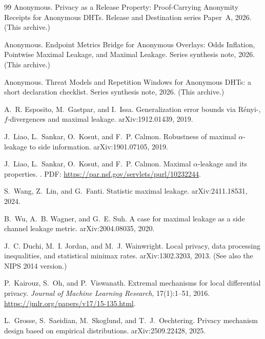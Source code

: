 \documentclass[11pt]{article}
\begin{document}
\begin{thebibliography}{99}
Anonymous.
\newblock Privacy as a Release Property: Proof-Carrying Anonymity Receipts for Anonymous DHTs.
\newblock Release and Destination series Paper~A, 2026. (This archive.)

Anonymous.
\newblock Endpoint Metrics Bridge for Anonymous Overlays: Odds Inflation, Pointwise Maximal Leakage, and Maximal Leakage.
\newblock Series synthesis note, 2026. (This archive.)

Anonymous.
\newblock Threat Models and Repetition Windows for Anonymous DHTs: a short declaration checklist.
\newblock Series synthesis note, 2026. (This archive.)

A.~R. Esposito, M.~Gastpar, and I.~Issa.
\newblock Generalization error bounds via R\'enyi-, $f$-divergences and maximal leakage.
\newblock arXiv:1912.01439, 2019.

J.~Liao, L.~Sankar, O.~Kosut, and F.~P. Calmon.
\newblock Robustness of maximal $\alpha$-leakage to side information.
\newblock arXiv:1901.07105, 2019.

J.~Liao, L.~Sankar, O.~Kosut, and F.~P. Calmon.
\newblock Maximal $\alpha$-leakage and its properties.
. PDF: \url{https://par.nsf.gov/servlets/purl/10232244}.

S.~Wang, Z.~Lin, and G.~Fanti.
\newblock Statistic maximal leakage.
\newblock arXiv:2411.18531, 2024.

B.~Wu, A.~B. Wagner, and G.~E. Suh.
\newblock A case for maximal leakage as a side channel leakage metric.
\newblock arXiv:2004.08035, 2020.

J.~C. Duchi, M.~I. Jordan, and M.~J. Wainwright.
\newblock Local privacy, data processing inequalities, and statistical minimax rates.
\newblock arXiv:1302.3203, 2013.
\newblock (See also the NIPS 2014 version.)

P.~Kairouz, S.~Oh, and P.~Viswanath.
\newblock Extremal mechanisms for local differential privacy.
\newblock \emph{Journal of Machine Learning Research}, 17(1):1--51, 2016.
\newblock \url{https://jmlr.org/papers/v17/15-135.html}.

L.~Grosse, S.~Saeidian, M.~Skoglund, and T.~J.~Oechtering.
\newblock Privacy mechanism design based on empirical distributions.
\newblock arXiv:2509.22428, 2025.


\end{thebibliography}
\end{document}
